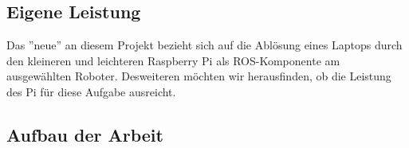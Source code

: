 \documentclass[12pt]{article}
\begin{document}









\subsection{Eigene Leistung}

Das ''neue'' an diesem Projekt bezieht sich
auf die Ablösung eines Laptops durch den kleineren und leichteren Raspberry Pi als ROS-Komponente am ausgewählten Roboter. Desweiteren möchten wir herausfinden, ob die Leistung des Pi für diese Aufgabe ausreicht.


\subsection{Aufbau der Arbeit}
\end{document}
